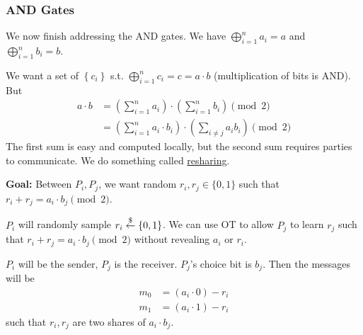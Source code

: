 \subsubsection{AND Gates}
We now finish addressing the \textsf{AND} gates. We have $\bigoplus^n_{i=1}a_i = a$ and $\bigoplus^n_{i=1}b_i = b$.

We want a set of $\left\{ c_i \right\}$ s.t. $\bigoplus^n_{i=1}c_i = c = a \cdot b$ (multiplication of bits is \textsf{AND}). But
\begin{align*}
    a\cdot b
     & = \left( \sum^n_{i=1}a_i \right)\cdot \left( \sum^n_{i=1}b_i \right)\pmod{2}                \\
     & = \left( \sum^n_{i=1}a_i\cdot b_i \right)\cdot \left( \sum_{i\neq j}a_i b_i \right)\pmod{2}
\end{align*}
The first sum is easy and computed locally, but the second sum requires parties to communicate. We do something called \ul{resharing}.

\textbf{Goal:} Between $P_i, P_j$, we want random $r_i, r_j\in\{0, 1\}$ such that $r_i + r_j = a_i \cdot b_j \pmod{2}$.

$P_i$ will randomly sample $r_i\overset{\$}{\leftarrow} \left\{ 0, 1 \right\}$. We can use OT to allow $P_j$ to learn $r_j$ such that $r_i + r_j = a_i\cdot b_j\pmod{2}$ without revealing $a_i$ or $r_i$.

$P_i$ will be the sender, $P_j$ is the receiver. $P_j$'s choice bit is $b_j$. Then the messages will be
\begin{align*}
    m_0 & = (a_i\cdot 0) - r_i \\
    m_1 & = (a_i\cdot 1) - r_i
\end{align*}
such that $r_i, r_j$ are two shares of $a_i\cdot b_j$.

